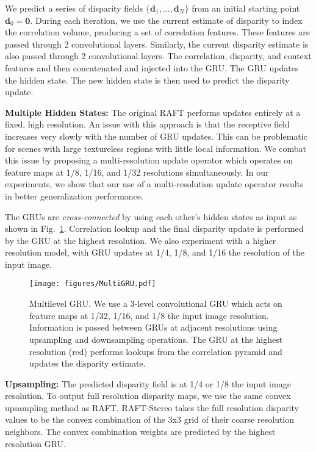 \documentclass[10pt,twocolumn,letterpaper]{article}
\begin{document}
We predict a series of disparity fields $\{\mathbf{d}_1, ..., \mathbf{d}_N \}$ from an initial starting point $\mathbf{d}_0 = \mathbf{0}$. During each iteration, we use the current estimate of disparity to index the correlation volume, producing a set of correlation features. These features are passed through 2 convolutional layers. Similarly, the current disparity estimate is also passed through 2 convolutional layers. The correlation, disparity, and context features and then concatenated and injected into the GRU. The GRU updates the hidden state. The new hidden state is then used to predict the disparity update.  \smallskip


\noindent\textbf{Multiple Hidden States:} The original RAFT performs updates entirely at a fixed, high resolution. An issue with this approach is that the receptive field increases very slowly with the number of GRU updates. This can be problematic for scenes with large textureless regions with little local information. We combat this issue by proposing a multi-resolution update operator which operates on feature maps at 1/8, 1/16, and 1/32 resolutions simultaneously. In our experiments, we show that our use of a multi-resolution update operator results in better generalization performance. 

The GRUs are \textit{cross-connected} by using each other's hidden states as input as shown in Fig.~\ref{fig:multileveldiagram}. Correlation lookup and the final disparity update is performed by the GRU at the highest resolution. We also experiment with a higher resolution model, with GRU updates at 1/4, 1/8, and 1/16 the resolution of the input image.


\begin{figure}[t]
    \centering
	\texttt{[image: figures/MultiGRU.pdf]}
	\caption{Multilevel GRU. We use a 3-level convolutional GRU which acts on feature maps at 1/32, 1/16, and 1/8 the input image resolution. Information is passed between GRUs at adjacent resolutions using upsampling and downsampling operations. The GRU at the highest resolution (red) performs lookups from the correlation pyramid and updates the disparity estimate.}\vspace{-0.5cm}
	\label{fig:multileveldiagram}
\end{figure}




\noindent\textbf{Upsampling:} The predicted disparity field is at 1/4 or 1/8 the input image resolution. To output full resolution disparity maps, we use the same convex upsampling method as RAFT. RAFT-Stereo takes the full resolution disparity values to be the convex combination of the 3x3 grid of their coarse resolution neighbors. The convex combination weights are predicted by the highest resolution GRU. \\
\end{document}
